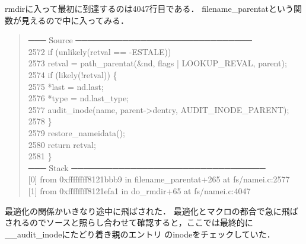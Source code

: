 rmdirに入って最初に到達するのは4047行目である．
filename\_parentatという関数が見えるので中に入ってみる．
\begin{quote}
─── Source ──────────────────────────────
\\
 2572      if (unlikely(retval == -ESTALE)) \\
 2573          retval = path\_parentat(\&nd, flags | LOOKUP\_REVAL, parent); \\
 2574      if (likely(!retval)) \{ \\
 2575          *last = nd.last; \\
 2576          *type = nd.last\_type; \\
 2577          audit\_inode(name, parent->dentry, AUDIT\_INODE\_PARENT); \\
 2578      \} \\
 2579      restore\_nameidata(); \\
 2580      return retval; \\
 2581  \} \\
─── Stack ─────────────────────────────────
\\
{[0]} from 0xffffffff8121bbb9 in filename\_parentat+265 at fs/namei.c:2577 \\
{[1]} from 0xffffffff8121efa1 in do\_rmdir+65 at fs/namei.c:4047
\end{quote}
最適化の関係かいきなり途中に飛ばされた．
最適化とマクロの都合で急に飛ばされるのでソースと照らし合わせて確認すると，ここでは最終的に\_\_audit\_inodeにたどり着き親のエントリ
のinodeをチェックしていた．

